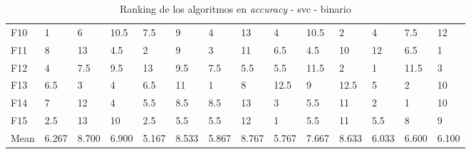 \begin{table}
\begin{adjustbox}{width=\linewidth}
\begin{tabular}{llllllllllllll}
            F10  & 1     & 6     & 10.5  & 7.5   & 9     & 4     & 13    & 4     & 10.5  & 2     & 4     & 7.5   & 12    \\
            F11  & 8     & 13    & 4.5   & 2     & 9     & 3     & 11    & 6.5   & 4.5   & 10    & 12    & 6.5   & 1     \\
            F12  & 4     & 7.5   & 9.5   & 13    & 9.5   & 7.5   & 5.5   & 5.5   & 11.5  & 2     & 1     & 11.5  & 3     \\
            F13  & 6.5   & 3     & 4     & 6.5   & 11    & 1     & 8     & 12.5  & 9     & 12.5  & 5     & 2     & 10    \\
            F14  & 7     & 12    & 4     & 5.5   & 8.5   & 8.5   & 13    & 3     & 5.5   & 11    & 2     & 1     & 10    \\
            F15  & 2.5   & 13    & 10    & 2.5   & 5.5   & 5.5   & 12    & 1     & 5.5   & 11    & 5.5   & 8     & 9     \\
            Mean & 6.267 & 8.700 & 6.900 & 5.167 & 8.533 & 5.867 & 8.767 & 5.767 & 7.667 & 8.633 & 6.033 & 6.600 & 6.100 \\
            \bottomrule
        \end{tabular}
    \end{adjustbox}
    \caption{Ranking de los algoritmos en \textit{accuracy} - svc - binario}
    \label{tab:ranking_accuracy_bin_svc}
\end{table}

